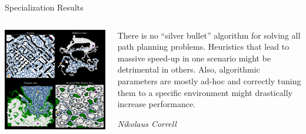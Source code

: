\documentclass[aspectratio=169]{beamer}
\makeatletter
\newcommand{\red}[1]{{\color{pureminimalistic@text@red} #1}}
\makeatother
\begin{document}
\begin{frame}{Specialization Results}
  \begin{columns}[T]
      \begin{column}{.6\linewidth}
      \centering
      \vspace{-1em}
      \includegraphics[height=0.9\textheight]{figures/learned2.pdf}
      \end{column}
      \begin{column}{.4\linewidth}
      \centering
      \epigraph{
      There is no “silver bullet” algorithm for solving all path planning problems. Heuristics that lead to massive speed-up in one scenario might be detrimental in others. Also, algorithmic parameters are mostly ad-hoc and correctly tuning them to a \red{specific environment} might drastically increase performance.
      }{\textit{
      Nikolaus Correll
      }}
      \end{column}
  \end{columns}
\end{frame}
\end{document}

